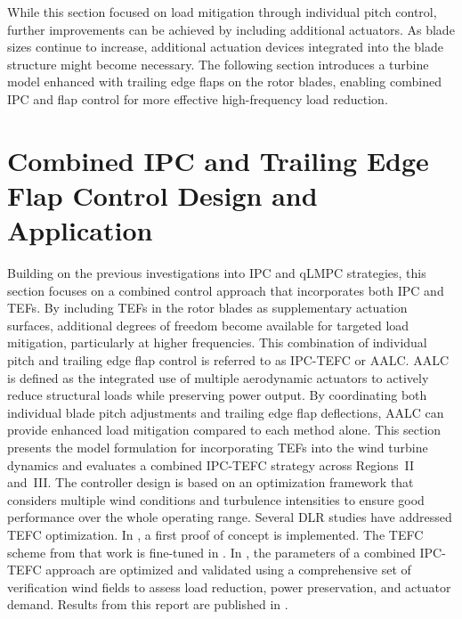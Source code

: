 While this section focused on load mitigation through individual pitch control, further 
improvements can be achieved by including additional actuators. As blade sizes continue to 
increase, additional actuation devices integrated into the blade structure might become 
necessary. The following section introduces a turbine model enhanced 
with trailing edge flaps on the rotor blades, enabling combined IPC and flap control for 
more effective high-frequency load reduction.

\let\oldsectionmark\sectionmark
\renewcommand{\sectionmark}[1]{\oldsectionmark{Combined IPC-TEFC Design and Application}}
\section{Combined IPC and Trailing Edge Flap Control Design and Application}
\label{sec:CombinedIPC-TrailingEdgeFlapControl}
\let\sectionmark\oldsectionmark

Building on the previous investigations into IPC and qLMPC strategies, this section focuses on a combined control approach that incorporates both IPC and TEFs. By including TEFs in the rotor blades as supplementary actuation surfaces, additional degrees of freedom become available for targeted load mitigation, particularly at higher frequencies. This combination of individual pitch and trailing edge flap control is referred to as IPC-TEFC or AALC. AALC is defined as the integrated use of multiple aerodynamic actuators to actively reduce structural loads while preserving power output. By coordinating both individual blade pitch adjustments and trailing edge flap deflections, AALC can provide enhanced load mitigation compared to each method alone. This section presents the model formulation for incorporating TEFs into the wind turbine dynamics and evaluates a combined IPC-TEFC strategy across Regions~II and~III. The controller design is based on an optimization framework that considers multiple wind conditions and turbulence intensities to ensure good performance over the whole operating range. Several DLR studies have addressed TEFC optimization. In \cite{kumar2019load}, a first proof of concept is implemented. The TEFC scheme from that work is fine-tuned in \cite{adolph2022reglerparameteroptimierung}. In \cite{osterwinter2023load}, the parameters of a combined IPC-TEFC approach are optimized and validated using a comprehensive set of verification wind fields to assess load reduction, power preservation, and actuator demand. Results from this report are published in \cite{dittmer2024combined}.


